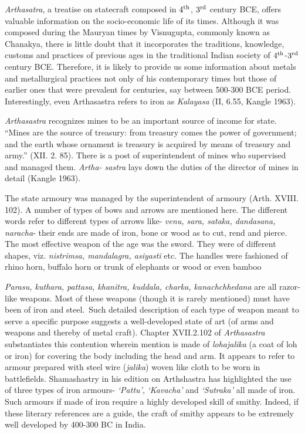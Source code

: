 {\it Arthasatra}, a treatise on statecraft composed in $4^{\rm th}$, $3^{\rm rd}$ century BCE, offers valuable information on the socio-economic life of its times. Although it was composed during the Mauryan times by Visnugupta, commonly known as Chanakya, there is little doubt that it incorporates the traditions, knowledge, customs and practices of previous ages in the traditional Indian society of $4^{\rm th}$-$3^{\rm rd}$ century BCE. Therefore, it is likely to provide us some information about metals and metallurgical practices not only of his contemporary times but those of earlier ones that were prevalent for centuries, say between 500-300 BCE period. Interestingly, even Arthasastra refers to iron as {\it Kalayasa} (II, 6.55, Kangle 1963).

{\it Arthasastra} recognizes mines to be an important source of income for state. “Mines are the source of treasury: from treasury comes the power of government; and the earth whose ornament is treasury is acquired by means of treasury and army.” (XII. 2. 85). There is a post of superintendent of mines who supervised and managed them. {\it Artha- sastra} lays down the duties of the director of mines in detail (Kangle 1963).

The state armoury was managed by the superintendent of armoury (Arth. XVIII. 102). A number of types of bows and arrows are mentioned here. The different words refer to different types of arrows like- {\it venu, sara, sataka, dandasana, naracha}- their ends are made of iron, bone or wood as to cut, rend and pierce. The most effective weapon of the age was the sword. They were of different shapes, viz. {\it nistrimsa, mandalagra, asiyasti} etc. The handles were fashioned of rhino horn, buffalo horn or trunk of elephants or wood or even bamboo

{\it Parasu, kuthara, pattasa, khanitra, kuddala, charka, kanachchhedana}  are all razor-like weapons. Most of these weapons (though it is rarely mentioned) must have been of iron and steel.~Such detailed description of each type of weapon meant to serve a specific purpose suggests a well-developed state of art (of arms and weapons and thereby of metal craft). Chapter XVII.2.102 of {\it Arthasastra} substantiates this contention wherein mention is made of {\it lohajalika} (a coat of loh or iron) for covering the body including the head and arm. It appears to refer to armour prepared with steel wire ({\it jalika}) woven like cloth to be worn in battlefields. Shamashastry in his edition on Arthshastra has highlighted the use of three types of iron armours- {\it ‘Pattu’}, {\it ‘Kavacha’} and {\it ‘Sutraka’} all made of iron. Such armours if made of iron require a highly developed skill of smithy. Indeed, if these literary references are a guide, the craft of smithy appears to be extremely well developed by 400-300 BC in India.

